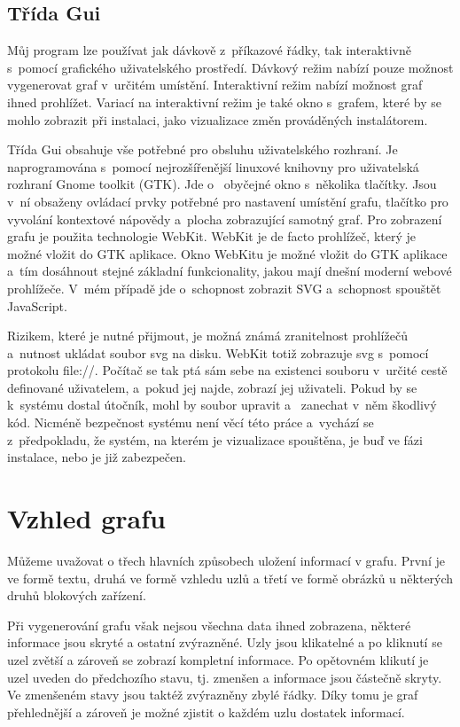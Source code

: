 \documentclass[color,table,oneside,nolot,nolof]{fithesis}
\begin{document}
\section{Třída Gui}
	Můj program lze používat jak dávkově z~příkazové řádky, tak interaktivně s~pomocí grafického uživatelského prostředí. Dávkový režim nabízí pouze možnost vygenerovat graf v~určitém 
	umístění. Interaktivní režim nabízí možnost graf ihned prohlížet. Variací na interaktivní režim je také okno s~grafem, které by se mohlo zobrazit při instalaci, jako vizualizace změn prováděných
	instalátorem. 

	Třída Gui obsahuje vše potřebné pro obsluhu uživatelského rozhraní. Je naprogramována s~pomocí nejrozšířenější linuxové knihovny pro uživatelská rozhraní Gnome toolkit (GTK). Jde o~
	obyčejné okno s~několika tlačítky. Jsou v~ní obsaženy ovládací prvky potřebné pro nastavení umístění grafu, tlačítko pro vyvolání kontextové
	nápovědy a~plocha zobrazující samotný graf. Pro zobrazení grafu je použita technologie WebKit. WebKit je de facto prohlížeč, který je možné vložit do GTK aplikace.
	Okno WebKitu je možné vložit do GTK aplikace a~tím dosáhnout stejné základní funkcionality,
	jakou mají dnešní moderní webové prohlížeče. V~mém případě jde o~schopnost zobrazit SVG a~schopnost spouštět JavaScript.

	Rizikem, které je nutné přijmout, je možná známá zranitelnost prohlížečů a~nutnost ukládat soubor svg na disku. WebKit totiž zobrazuje svg s~pomocí protokolu file://. Počítač se
	tak ptá sám sebe na existenci souboru v~určité cestě definované uživatelem, a~pokud jej najde, zobrazí jej uživateli. Pokud by se k~systému dostal útočník, mohl by soubor upravit a~
	zanechat v~něm škodlivý kód. Nicméně bezpečnost systému není věcí této práce a~vychází se z~předpokladu, že systém, na kterém je vizualizace spouštěna, je buď ve fázi instalace, nebo
	je již zabezpečen. 

\chapter{Vzhled grafu}
  Můžeme uvažovat o třech hlavních způsobech uložení informací v grafu. První je ve formě textu, druhá ve formě vzhledu uzlů a třetí ve formě obrázků 
	u některých druhů blokových zařízení. 

	Při vygenerování grafu však nejsou všechna data ihned zobrazena, některé informace jsou skryté a ostatní zvýrazněné. Uzly jsou klikatelné a po kliknutí
	se uzel zvětší a zároveň se zobrazí kompletní informace. Po opětovném klikutí je uzel uveden do předchozího stavu, tj. zmenšen a informace jsou částečně 
	skryty. Ve zmenšeném stavy jsou taktéž zvýrazněny zbylé řádky. Díky tomu je graf přehlednější a zároveň je možné zjistit o každém uzlu dostatek informací.
\end{document}
